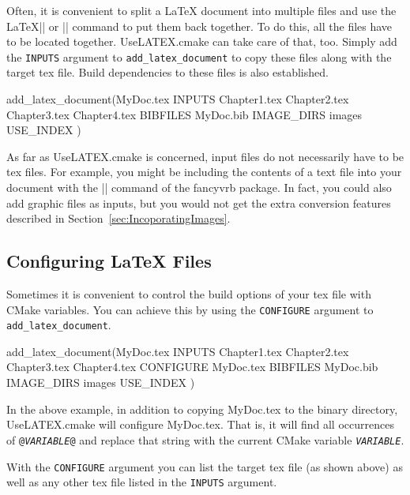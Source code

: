 \documentclass{article}
\newcommand*{\textfile}[1]{\textsf{#1}}
\newcommand*{\textlatexpackage}[1]{\textsf{#1}}
\newcommand*{\textcmake}[1]{\texttt{#1}}
\newcommand*{\textcmakevar}[1]{\textcmake{#1}}
\newcommand*{\textvar}[1]{\textit{#1}}
\newcommand*{\UseLATEX}{\textfile{UseLATEX.cmake}\xspace}
\newcommand*{\latex}{\LaTeX\xspace}
\newcommand*{\ald}{\textcmake{add\_latex\_document}\xspace}
\begin{document}
  Often, it is convenient to split a \latex document into multiple files
  and use the \latex \textlatex|| or \textlatex|| command to
  put them back together. To do this, all the files have to be located
  together. \UseLATEX can take care of that, too. Simply add the
  \textcmake{INPUTS} argument to \ald to copy these files along with the
  target tex file. Build dependencies to these files is also established.

  \begin{CodeListing}
add_latex_document(MyDoc.tex
  INPUTS Chapter1.tex Chapter2.tex Chapter3.tex Chapter4.tex
  BIBFILES MyDoc.bib
  IMAGE_DIRS images
  USE_INDEX
  )
  \end{CodeListing}

  As far as \UseLATEX is concerned, input files do not necessarily have to
  be tex files.  For example, you might be including the contents of a text
  file into your document with the \textlatex|\VerbatimInput| command of
  the \textlatexpackage{fancyvrb} package.  In fact, you could also add
  graphic files as inputs, but you would not get the extra conversion
  features described in Section~\ref{sec:IncoporatingImages}.

  \subsection{Configuring \latex Files}
  \label{sec:ConfiguringLatexFiles}

  Sometimes it is convenient to control the build options of your tex file
  with CMake variables. You can achieve this by using the
  \textcmake{CONFIGURE} argument to \ald.

  \begin{CodeListing}
add_latex_document(MyDoc.tex
  INPUTS Chapter1.tex Chapter2.tex Chapter3.tex Chapter4.tex
  CONFIGURE MyDoc.tex
  BIBFILES MyDoc.bib
  IMAGE_DIRS images
  USE_INDEX
  )
  \end{CodeListing}

  In the above example, in addition to copying \textfile{MyDoc.tex} to the
  binary directory, \UseLATEX will configure \textfile{MyDoc.tex}. That is,
  it will find all occurrences of \textcmake{@\textvar{VARIABLE}@} and
  replace that string with the current CMake variable
  \textcmakevar{\textvar{VARIABLE}}.

  With the \textcmake{CONFIGURE} argument you can list the target tex file
  (as shown above) as well as any other tex file listed in the
  \textcmake{INPUTS} argument.
\end{document}
